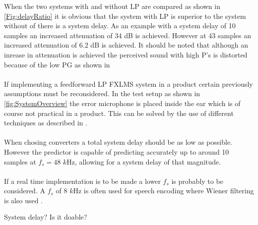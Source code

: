 When the two systems with and without LP are compared as shown in \autoref{Fig:delayRatio} it is obvious that the system with LP is superior to the system without of there is a system delay. As an example with a system delay of 10 samples an increased attenuation of 34 dB is achieved. However at 43 samples an increased attenuation of 6.2 dB is achieved. It should be noted that although an inrease in attenuation is achieved the perceived sound with high P's is distorted because of the low PG as shown in     
\\\\
If implementing a feedforward LP FXLMS system in a product certain previously assumptions must be reconsidered. In the test setup as shown in \autoref{fig:SystemOverview} the error microphone is placed inside the ear which is of course not practical in a product. This can be solved by the use of different techniques as described in \cite{Hansen}.  
\\\\
When chosing converters a total system delay should be as low as possible. However the predictor is capable of predicting accurately up to around 10 samples at $f_s=48$ $k$Hz, allowing for a system delay of that magnitude.
\\\\
If a real time implementation is to be made a lower $f_s$ is probably to be considered. A $f_s$ of 8 $k$Hz is often used for speech encoding where Wiener filtering is also used \cite{Speech}.   


System delay?
Is it doable?








